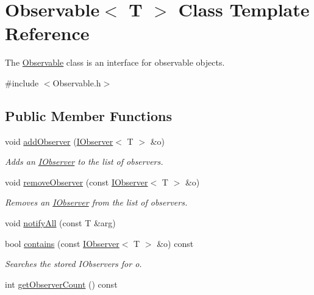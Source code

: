 \hypertarget{class_observable}{}\section{Observable$<$ T $>$ Class Template Reference}
\label{class_observable}


The \hyperlink{class_observable}{Observable} class is an interface for observable objects.  




{\ttfamily \#include $<$Observable.\+h$>$}

\subsection*{Public Member Functions}
\begin{DoxyCompactItemize}
\item 
\hypertarget{class_observable_a5caccd0c60c6e11843be0ee0197d34e1}{}void \hyperlink{class_observable_a5caccd0c60c6e11843be0ee0197d34e1}{add\+Observer} (\hyperlink{struct_i_observer}{I\+Observer}$<$ T $>$ \&o)\label{class_observable_a5caccd0c60c6e11843be0ee0197d34e1}

\begin{DoxyCompactList}\small\item\em Adds an \hyperlink{struct_i_observer}{I\+Observer} to the list of observers. \end{DoxyCompactList}\item 
\hypertarget{class_observable_a88784c910caefa3a830025209d71adb3}{}void \hyperlink{class_observable_a88784c910caefa3a830025209d71adb3}{remove\+Observer} (const \hyperlink{struct_i_observer}{I\+Observer}$<$ T $>$ \&o)\label{class_observable_a88784c910caefa3a830025209d71adb3}

\begin{DoxyCompactList}\small\item\em Removes an \hyperlink{struct_i_observer}{I\+Observer} from the list of observers. \end{DoxyCompactList}\item 
void \hyperlink{class_observable_a2f2f224a73edbb6d42f6534ba0d28602}{notify\+All} (const T \&arg)
\item 
bool \hyperlink{class_observable_a0c1d70ff73428b7c24c377625ae12b45}{contains} (const \hyperlink{struct_i_observer}{I\+Observer}$<$ T $>$ \&o) const 
\begin{DoxyCompactList}\small\item\em Searches the stored I\+Observers for \textquotesingle{}o\textquotesingle{}. \end{DoxyCompactList}\item 
int \hyperlink{class_observable_ae456acb86c86d431ac571ceee71aab0a}{get\+Observer\+Count} () const 
\end{DoxyCompactItemize}
